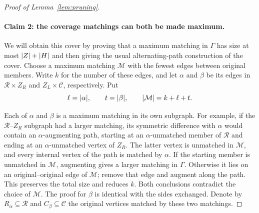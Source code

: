 \begin{proof}[Proof of Lemma~\ref{lem:pruning}]
\paragraph{Claim 2: the coverage matchings can both be made maximum.}
We will obtain this cover by proving that a maximum matching in $\Gamma$
has size at most $\lvert Z\rvert+\lvert H\rvert$ and then giving the usual alternating-path
construction of the cover.  Choose a maximum matching $\mathcal M$ with
the fewest edges between original members.  Write $k$ for the number of
these edges, and let $\alpha$ and $\beta$ be its edges in
$\mathcal R\times Z_R$ and $Z_L\times\mathcal C$, respectively.  Put
\[
 \ell=\lvert \alpha\rvert,\qquad t=\lvert \beta\rvert,
 \qquad\lvert \mathcal M\rvert=k+\ell+t.
\]

Each of $\alpha$ and $\beta$ is a maximum matching in its own subgraph.
For example, if the $\mathcal R$--$Z_R$ subgraph had a larger matching,
its symmetric difference with $\alpha$ would contain an
$\alpha$-augmenting path, starting at an $\alpha$-unmatched member of
$\mathcal R$ and ending at an $\alpha$-unmatched vertex of $Z_R$.
The latter vertex is unmatched in $\mathcal M$, and every internal vertex
of the path is matched by $\alpha$.  If the starting member is unmatched
in $\mathcal M$, augmenting gives a larger matching in $\Gamma$.
Otherwise it lies on an original--original edge of $\mathcal M$;
remove that edge and augment along the path.  This preserves the total
size and reduces $k$.  Both conclusions contradict the choice of
$\mathcal M$.  The proof for $\beta$ is identical with the sides
exchanged.  Denote by $R_\alpha\subseteq\mathcal R$ and
$C_\beta\subseteq\mathcal C$ the original vertices matched by these
two matchings.


\end{proof}
